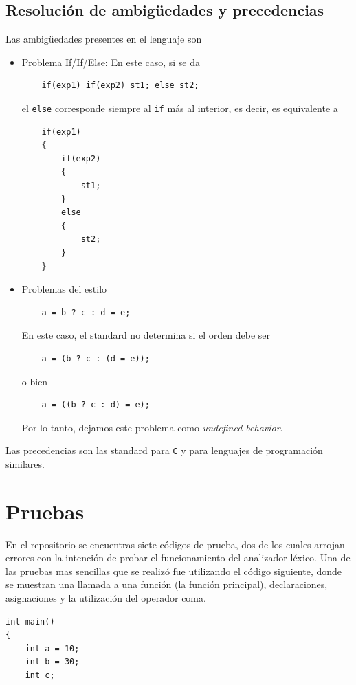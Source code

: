 \documentclass[12pt]{article}
\begin{document}
\begin{itemize}
\subsection*{Resoluci\'on de ambig\"uedades y precedencias}




Las ambig\"uedades presentes en el lenguaje son
\begin{itemize}
    \item Problema If/If/Else: En este caso, si se da
    \begin{verbatim}
    if(exp1) if(exp2) st1; else st2;
    \end{verbatim}
    el \texttt{else} corresponde siempre al \texttt{if} m\'as al interior, es decir, es equivalente a
    \begin{verbatim}
    if(exp1)
    {
        if(exp2)
        {
            st1;
        }
        else
        {
            st2;
        }
    }
    \end{verbatim}
    \item Problemas del estilo
    \begin{verbatim}
    a = b ? c : d = e;
    \end{verbatim}
    En este caso, el standard no determina si el orden debe ser
    \begin{verbatim}
    a = (b ? c : (d = e));
    \end{verbatim}
    o bien
    \begin{verbatim}
    a = ((b ? c : d) = e);
    \end{verbatim}
    Por lo tanto, dejamos este problema como \textit{undefined behavior}.
\end{itemize}

Las precedencias son las standard para \texttt{C} y para lenguajes de programaci\'on similares.

\section*{Pruebas}
En el repositorio se encuentras siete c\'odigos de prueba, dos de los cuales arrojan errores con la intenci\'on de probar el funcionamiento del analizador l\'exico.
Una de las pruebas mas sencillas que se realiz\'o fue utilizando el c\'odigo siguiente, donde se muestran una llamada a una funci\'on (la funci\'on principal), declaraciones, asignaciones y la utilizaci\'on del operador coma. 
\begin{verbatim}
int main()
{
    int a = 10;
    int b = 30;
    int c;
    

\end{verbatim}
\end{itemize}
\end{document}
